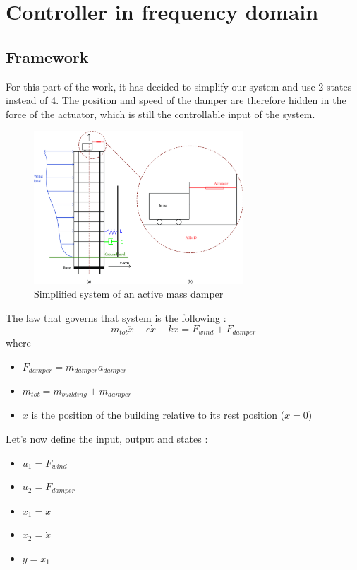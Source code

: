 \section{Controller in frequency domain}

\subsection{Framework}
For this part of the work, it has decided to simplify our system and use 2 states instead of 4. The position and speed of the damper are therefore hidden in the force of the actuator, which is still the controllable input of the system.
\begin{figure}[H]
    \centering
    \includegraphics[width=0.7\textwidth]{resources/png/4_simplified-system.png}
    \caption{Simplified system of an active mass damper}
    \label{fig:simplified-system}
\end{figure}
The law that governs that system is the following : 
$$
m_{tot}\ddot{x} + c\dot{x} + kx = F_{wind} + F_{damper}
$$
where
\begin{itemize}
    \item $F_{damper} = m_{damper}a_{damper}$
    \item $m_{tot} = m_{building} + m_{damper}$
    \item $x$ is the position of the building relative to its rest position ($x = 0$)
\end{itemize}
Let's now define the input, output and states : 
\begin{itemize}
    \item $u_1 = F_{wind}$
    \item $u_2 = F_{damper}$
    \item $x_1 = x$
    \item $x_2 = \dot{x}$
    \item $y = x_1$ 
\end{itemize}
